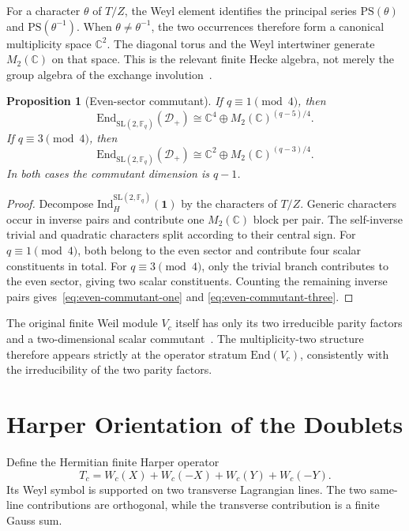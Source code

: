 \documentclass[11pt,a4paper]{article}
\newtheorem{proposition}[theorem]{Proposition}
\theoremstyle{definition}
\theoremstyle{remark}
\newcommand{\C}{\mathbb{C}}
\newcommand{\Fq}{\mathbb{F}_q}
\newcommand{\G}{\mathrm{SL}(2,\Fq)}
\newcommand{\End}{\mathrm{End}}
\newcommand{\Ind}{\mathrm{Ind}}
\newcommand{\Id}{\mathbf{1}}
\newcommand{\Dplus}{\mathcal{D}_{+}}
\begin{document}
For a character $\theta$ of $T/Z$, the Weyl element identifies the principal series
$\mathrm{PS}(\theta)$ and $\mathrm{PS}(\theta^{-1})$.
When $\theta\ne\theta^{-1}$, the two occurrences therefore form a canonical multiplicity
space $\C^2$.
The diagonal torus and the Weyl intertwiner generate $M_2(\C)$ on that space.
This is the relevant finite Hecke algebra, not merely the group algebra of the exchange
involution~\cite{Iwahori1964}.

\begin{proposition}[Even-sector commutant]
  \label{prop:even-commutant}
  If $q\equiv1\pmod4$, then
  \begin{equation}
    \End_{\G}(\Dplus)
    \cong\C^4\oplus M_2(\C)^{(q-5)/4}.
    \label{eq:even-commutant-one}
  \end{equation}
  If $q\equiv3\pmod4$, then
  \begin{equation}
    \End_{\G}(\Dplus)
    \cong\C^2\oplus M_2(\C)^{(q-3)/4}.
    \label{eq:even-commutant-three}
  \end{equation}
  In both cases the commutant dimension is $q-1$.
\end{proposition}

\begin{proof}
  Decompose $\Ind_H^{\G}(\Id)$ by the characters of $T/Z$.
  Generic characters occur in inverse pairs and contribute one $M_2(\C)$ block per pair.
  The self-inverse trivial and quadratic characters split according to their central sign.
  For $q\equiv1\pmod4$, both belong to the even sector and contribute four scalar
  constituents in total.
  For $q\equiv3\pmod4$, only the trivial branch contributes to the even sector, giving two
  scalar constituents.
  Counting the remaining inverse pairs gives~\eqref{eq:even-commutant-one} and
  \eqref{eq:even-commutant-three}.
\end{proof}

The original finite Weil module $V_c$ itself has only its two irreducible parity factors and
a two-dimensional scalar commutant~\cite{Korinman2013}.
The multiplicity-two structure therefore appears strictly at the operator stratum
$\End(V_c)$, consistently with the irreducibility of the two parity factors.

\section{Harper Orientation of the Doublets}
\label{sec:harper}

Define the Hermitian finite Harper operator~\cite{Harper1955}
\begin{equation}
  T_c=W_c(X)+W_c(-X)+W_c(Y)+W_c(-Y).
  \label{eq:harper}
\end{equation}
Its Weyl symbol is supported on two transverse Lagrangian lines.
The two same-line contributions are orthogonal, while the transverse contribution is a
finite Gauss sum.
\end{document}
